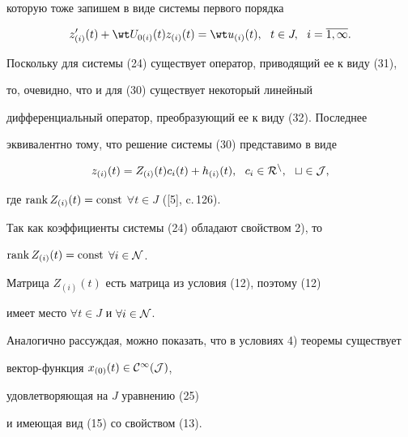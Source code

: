 \begin{pf}
которую тоже запишем в виде системы первого порядка


\begin{equation}


z'_{(i)}(t)+ \wt U_{0(i)}(t) z_{(i)}(t)= \wt u_{(i)}(t),


\ \ t \in J, \ \ i=\overline{1,\infty}.


\end{equation}


Поскольку для системы (24) существует оператор, приводящий ее к виду (31),


то, очевидно, что и для (30) существует некоторый линейный 


дифференциальный оператор, преобразующий ее к виду (32). Последнее 


эквивалентно тому, что решение системы (30) представимо в виде 


$$


z_{(i)}(t)=Z_{(i)}(t) c_i(t)+h_{(i)}(t), \ \


c_i \in \cal R^n, \ \ t \in J,


$$


где $\operatorname{rank} Z_{(i)}(t)=\operatorname{const}$ \; $\forall t \in J$ ([5], c.\,126).


Так как коэффициенты системы (24) обладают свойством 2), то


$\operatorname{rank} Z_{(i)}(t)=\operatorname{const}$ \; $\forall i \in \cal N$.





Матрица $Z_{(i)}(t)$ есть матрица из условия (12), поэтому (12)


имеет место $\forall t \in J$ и $\forall i \in \cal N$.





Аналогично рассуждая, можно показать, что в условиях 4) теоремы существует


вектор-функция $x_{(0)}(t) \in \cal C^{\infty }(J)$, 


удовлетворяющая на $J$ уравнению (25)


и имеющая вид (15) со свойством (13).


\end{pf}





